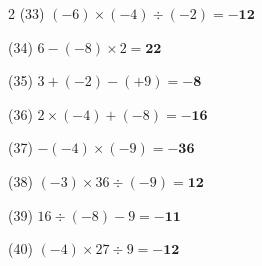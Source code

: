 \documentclass[a4paper, 11pt]{ltjsarticle}
\begin{document}
\begin{multicols*}{2}
\noindent (33) \quad $(-6)\times(-4)\div(-2) = \mathbf{-12}$
\vspace*{\fill}

\noindent (34) \quad $6-(-8)\times2 = \mathbf{22}$
\vspace*{\fill}

\noindent (35) \quad $3+(-2)-(+9) = \mathbf{-8}$
\vspace*{\fill}

\noindent (36) \quad $2\times(-4)+(-8) = \mathbf{-16}$
\vspace*{\fill}

\noindent (37) \quad $-(-4)\times(-9) = \mathbf{-36}$
\vspace*{\fill}

\noindent (38) \quad $(-3)\times36\div(-9) = \mathbf{12}$
\vspace*{\fill}

\noindent (39) \quad $16\div(-8)-9 = \mathbf{-11}$
\vspace*{\fill}

\noindent (40) \quad $(-4)\times27\div9 = \mathbf{-12}$
\vspace*{\fill}

\end{multicols*}
\end{document}
